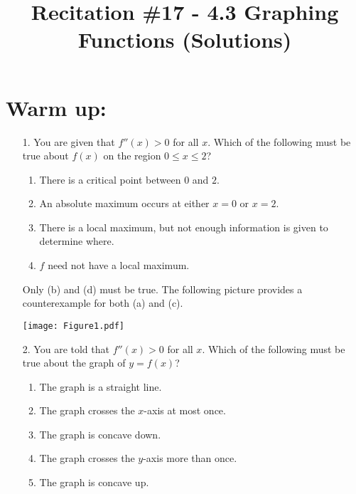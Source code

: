 \documentclass[nooutcomes]{ximera}
\title{Recitation \#17 - 4.3 Graphing Functions (Solutions)}
\begin{document}
\begin{abstract}		\end{abstract}
\maketitle

\section*{Warm up:} 

	\begin{enumerate}
	
	\item[1.]  You are given that $f''(x) > 0$ for all $x$.  Which of the following must be true about $f(x)$ on the region $0 \leq x \leq 2$?
		\begin{enumerate}
		
		\item  There is a critical point between $0$ and $2$.  
		\item  An absolute maximum occurs at either $x=0$ or $x=2$.
		\item  There is a local maximum, but not enough information is given to determine where.
		\item  $f$ need not have a local maximum.
		
		\end{enumerate}

			\begin{freeResponse}
			Only (b) and (d) must be true.  The following picture provides a counterexample for both (a) and (c).
			
			\begin{image}
			\texttt{[image: Figure1.pdf]}
			\end{image}
						
			\end{freeResponse}	
		
		
		
	\item[2.]  You are told that $f''(x) > 0$ for all $x$.  Which of the following must be true about the graph of $y=f(x)$?
		\begin{enumerate}
		
		\item  The graph is a straight line.  
		\item  The graph crosses the $x$-axis at most once.
		\item  The graph is concave down.
		\item  The graph crosses the $y$-axis more than once.
		\item  The graph is concave up.
		

\end{enumerate}
\end{enumerate}
\end{document}
